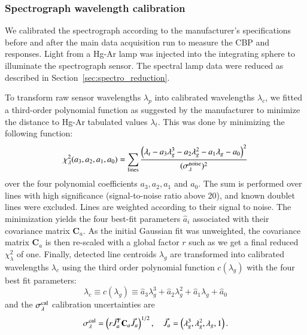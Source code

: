 \subsubsection{Spectrograph wavelength calibration}

We calibrated the spectrograph according to the manufacturer's specifications before and after the main data acquisition run to measure the CBP and \SD responses. Light from a Hg-Ar lamp was injected into the integrating sphere to illuminate the spectrograph sensor. The spectral lamp data were reduced as described in Section~\ref{sec:spectro_reduction}.




To transform raw sensor wavelengths $\lambda_p$ into calibrated wavelengths $\lambda_c$, we fitted a third-order polynomial function as suggested by the manufacturer to minimize the distance to Hg-Ar tabulated values $\lambda_t$. This was done by minimizing the following function: 
\begin{equation}
    \chi_\lambda^2(a_3, a_2, a_1, a_0) = \sum_{\text{lines}} \frac{\left(\lambda_t-a_3 \lambda_g^3 - a_2 \lambda_g^2-a_1 \lambda_g -a_0\right)^2}{(\sigma_\lambda^{\rm noise})^2}
\end{equation}
over the four polynomial coefficients $a_3, a_2, a_1$ and $a_0$. The sum is performed over lines with high significance (signal-to-noise ratio above 20), and known doublet lines were excluded. Lines are weighted according to their signal to noise. The minimization yields the four best-fit parameters $\hat a_i$ associated with their covariance matrix $\mathbf{C}_a$. 
As the initial Gaussian fit was unweighted, the covariance matrix $\mathbf{C}_a$ is then re-scaled with a global factor $r$ such as we get a final reduced $\chi_\lambda^2$ of one. 
Finally, detected line centroids $\lambda_g$ are transformed into calibrated wavelengths $\lambda_c$ using the third order polynomial function $c(\lambda_g)$ with the four best fit parameters:  
\begin{equation}
    \lambda_c \equiv c(\lambda_g) \equiv \hat a_3 \lambda_g^3 + \hat a_2 \lambda_g^2+\hat a_1 \lambda_g +\hat a_0
\end{equation}
and the $\sigma_\lambda^{\rm cal}$ calibration uncertainties are
\begin{equation}
    \sigma_\lambda^{\rm cal} = \left(r\vec J_a^T \mathbf{C}_a \vec J_a\right)^{1/2},\quad \vec J_a = \left(\lambda_g^3, \lambda_g^2, \lambda_g, 1\right).
\end{equation}

